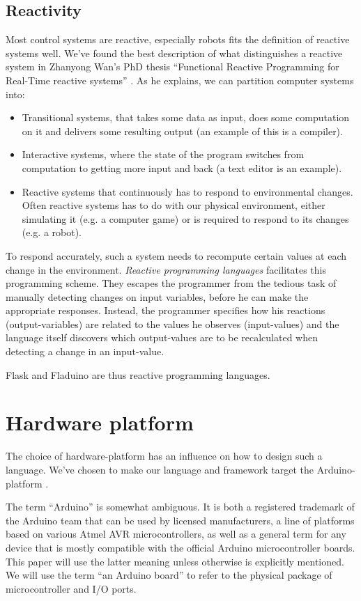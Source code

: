 \documentclass[a4paper, oneside, final]{memoir}
\begin{document}
\subsection{Reactivity}
Most control systems are reactive, especially robots fits the
definition of reactive systems well. We've found the best description
of what distinguishes a reactive system in Zhanyong Wan's PhD thesis
``Functional Reactive Programming for Real-Time reactive systems''
\cite{Chambers1992}.  As he explains, we can partition computer systems
into:
\begin{itemize}
\item Transitional systems, that takes some data as input, does some
  computation on it and delivers some resulting output (an example of this
  is a compiler).
\item Interactive systems, where the state of the program switches
  from computation to getting more input and back (a text editor is an
  example).
\item Reactive systems that continuously has to respond to
  environmental changes. Often reactive systems has to do with our
  physical environment, either simulating it (e.g. a computer game) or
  is required to respond to its changes (e.g. a robot).
\end{itemize}

To respond accurately, such a system needs to recompute certain values
at each change in the environment. \textit{Reactive programming
  languages} facilitates this programming scheme. They escapes the
programmer from the tedious task of manually detecting changes on
input variables, before he can make the appropriate
responses. Instead, the programmer specifies how his reactions
(output-variables) are related to the values he observes
(input-values) and the language itself discovers which output-values
are to be recalculated when detecting a change in an input-value.

Flask and Fladuino are thus reactive programming languages.


\section{Hardware platform}
\label{sec:hardware platform}
The choice of hardware-platform has an influence on how to design such
a language. We've chosen to make our language and framework target the
Arduino-platform \cite{arduino}.

The term ``Arduino'' is somewhat ambiguous.  It is both a registered
trademark of the Arduino team that can be used by licensed
manufacturers, a line of platforms based on various Atmel AVR
microcontrollers, as well as a general term for any device that is
mostly compatible with the official Arduino microcontroller boards.
This paper will use the latter meaning unless otherwise is explicitly
mentioned.  We will use the term ``an Arduino board'' to refer to the
physical package of microcontroller and I/O ports.
\end{document}
